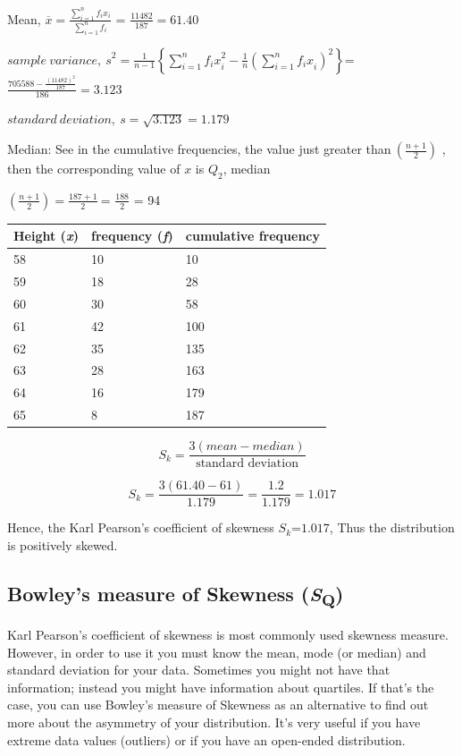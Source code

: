 \documentclass[
]{book}
\begin{document}
Mean,
\(\overline{x} = \frac{\sum_{i = 1}^{n}{f_{i}x_{i}}}{\sum_{i = 1}^{n}f_{i}}\)
= \(\frac{11482}{187} = 61.40\)

\({sample\ variance,\ s}^{2} = \frac{1}{n - 1}\left\{ \sum_{i = 1}^{n}{{f_{i}x}_{i}^{2} - \frac{1}{n}}\left( \sum_{i = 1}^{n}{f_{i}x}_{i} \right)^{2} \right\}\)=
\(\frac{705588 - \frac{\left( 11482 \right)^{2}}{187}}{186} = 3.123\)

\(standard\ deviation,\ s = \sqrt{3.123} = 1.179\)

Median: See in the cumulative frequencies, the value just greater
than\(\ \left( \frac{n + 1}{2} \right)\) , then the corresponding value of
\(x\) is \(Q_{2}\), median

\(\left( \frac{n + 1}{2} \right) = \frac{187 + 1}{2}\ \)= \(\frac{188}{2}\)
= 94

\begin{longtable}[]{@{}lll@{}}
\toprule
Height (\emph{x}) & frequency (\emph{f}) & cumulative frequency \\
\midrule
\endhead
58 & 10 & 10 \\
59 & 18 & 28 \\
60 & 30 & 58 \\
61 & 42 & 100 \\
62 & 35 & 135 \\
63 & 28 & 163 \\
64 & 16 & 179 \\
65 & 8 & 187 \\
\bottomrule
\end{longtable}

\[S_{k} = \frac{3(mean - median)}{\text{standard deviation}}\]

\[S_{k} = \frac{3(61.40 - 61)}{1.179} = \frac{1.2}{1.179} = 1.017\]

Hence, the Karl Pearson's coefficient of skewness \(S_{k}\)=\(1.017\), Thus
the distribution is positively skewed.

\hypertarget{bowleys-measure-of-skewness-sq}{%
\subsection{\texorpdfstring{Bowley's measure of Skewness (\emph{S}\textsubscript{Q})}{Bowley's measure of Skewness (SQ)}}\label{bowleys-measure-of-skewness-sq}}

Karl Pearson's coefficient of skewness is most commonly used skewness
measure. However, in order to use it you must know the mean, mode (or
median) and standard deviation for your data. Sometimes you might not
have that information; instead you might have information about
quartiles. If that's the case, you can use Bowley's measure of Skewness
as an alternative to find out more about the asymmetry of your
distribution. It's very useful if you have extreme data values
(outliers) or if you have an open-ended distribution.
\end{document}
